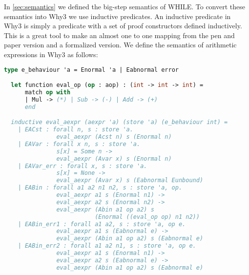 In \ref{sec:semantics} we defined the big-step semantics of WHILE.
To convert these semantics into Why3 we use inductive predicates.
An inductive predicate in Why3 is simply a predicate with a set of proof constructors defined inductively.
This is a great tool to make an almost one to one mapping from the pen and paper version and a formalized version.
We define the semantics of arithmetic expressions in Why3 as follows:

\begin{lstlisting}[caption={Semantics of arithmetic expressions},label={lst:why3aexpr},language=sml]
  type e_behaviour 'a = Enormal 'a | Eabnormal error

  let function eval_op (op : aop) : (int -> int -> int) =
      match op with
      | Mul -> (*) | Sub -> (-) | Add -> (+)
      end

  inductive eval_aexpr (aexpr 'a) (store 'a) (e_behaviour int) =
    | EACst : forall n, s : store 'a.
               eval_aexpr (Acst n) s (Enormal n)
    | EAVar : forall x n, s : store 'a.
               s[x] = Some n ->
               eval_aexpr (Avar x) s (Enormal n)
    | EAVar_err : forall x, s : store 'a.
               s[x] = None ->
               eval_aexpr (Avar x) s (Eabnormal Eunbound)
    | EABin : forall a1 a2 n1 n2, s : store 'a, op.
               eval_aexpr a1 s (Enormal n1) ->
               eval_aexpr a2 s (Enormal n2) ->
               eval_aexpr (Abin a1 op a2) s
                          (Enormal ((eval_op op) n1 n2))
    | EABin_err1 : forall a1 a2, s : store 'a, op e.
               eval_aexpr a1 s (Eabnormal e) ->
               eval_aexpr (Abin a1 op a2) s (Eabnormal e)
    | EABin_err2 : forall a1 a2 n1, s : store 'a, op e.
               eval_aexpr a1 s (Enormal n1) ->
               eval_aexpr a2 s (Eabnormal e) ->
               eval_aexpr (Abin a1 op a2) s (Eabnormal e)
\end{lstlisting}

